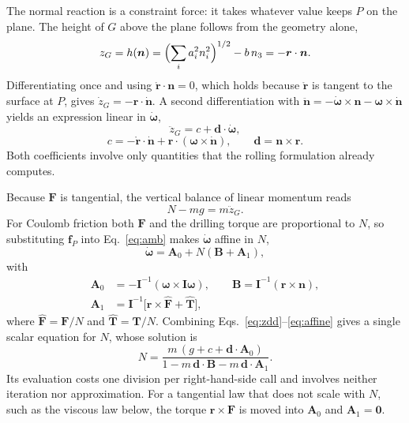 \documentclass[aps,pre,twocolumn,superscriptaddress,amsmath,amssymb,floatfix,nofootinbib]{revtex4-2}
\newcommand{\rpg}{\bm{r}}
\newcommand{\ve}[1]{\bm{#1}}
\newcommand{\rdot}{\mathring{\bm r}}
\begin{document}
The normal reaction is a constraint force: it takes whatever value keeps $P$ on the
plane. The height of $G$ above the plane follows from the geometry alone,
\begin{equation}
z_G=h(\ve n)=\Bigl(\sum_i a_i^2n_i^2\Bigr)^{1/2}-b\,n_3=-\rpg\cdot\ve n .
\label{eq:height}
\end{equation}
Differentiating once and using $\rdot\cdot\ve n=0$, which holds because $\rdot$ is
tangent to the surface at $P$, gives $\dot z_G=-\rpg\cdot\dot{\ve n}$. A second
differentiation with $\ddot{\ve n}=-\dot{\bm\omega}\times\ve n-\bm\omega\times\dot{\ve
n}$ yields an expression linear in $\dot{\bm\omega}$,
\begin{equation}
\ddot z_G=c+\ve d\cdot\dot{\bm\omega},
\label{eq:zdd}
\end{equation}
\begin{equation}
c=-\rdot\cdot\dot{\ve n}+\rpg\cdot(\bm\omega\times\dot{\ve n}),\qquad
\ve d=\ve n\times\rpg .
\label{eq:cd}
\end{equation}
Both coefficients involve only quantities that the rolling formulation already
computes.

Because $\ve F$ is tangential, the vertical balance of linear momentum reads
\begin{equation}
N-mg=m\ddot z_G .
\label{eq:vertical}
\end{equation}
For Coulomb friction both $\ve F$ and the drilling torque are proportional to $N$, so
substituting $\ve f_P$ into Eq.~\eqref{eq:amb} makes $\dot{\bm\omega}$ affine in $N$,
\begin{equation}
\dot{\bm\omega}=\ve A_0+N(\ve B+\ve A_1),
\label{eq:affine}
\end{equation}
with
\begin{equation}
\begin{aligned}
\ve A_0&=-\ve I^{-1}(\bm\omega\times\ve I\bm\omega),\qquad
\ve B=\ve I^{-1}(\rpg\times\ve n),\\
\ve A_1&=\ve I^{-1}\bigl[\rpg\times\hat{\ve F}+\hat{\ve T}\bigr],
\end{aligned}
\label{eq:AB}
\end{equation}
where $\hat{\ve F}=\ve F/N$ and $\hat{\ve T}=\ve T/N$. Combining
Eqs.~\eqref{eq:zdd}--\eqref{eq:affine} gives a single scalar equation for $N$, whose
solution is
\begin{equation}
N=\frac{m\,(g+c+\ve d\cdot\ve A_0)}{1-m\,\ve d\cdot\ve B-m\,\ve d\cdot\ve A_1}.
\label{eq:N}
\end{equation}
Its evaluation costs one division per right-hand-side call and involves neither
iteration nor approximation. For a tangential law that does not scale with $N$, such as
the viscous law below, the torque $\rpg\times\ve F$ is moved into $\ve A_0$ and
$\ve A_1=\ve 0$.
\end{document}
